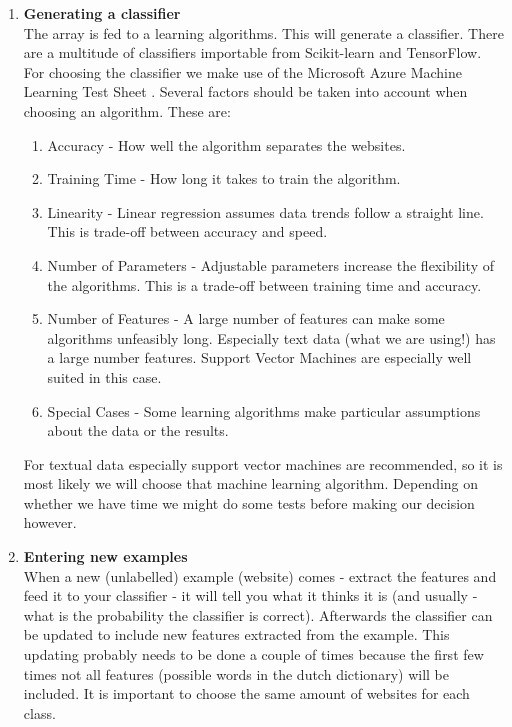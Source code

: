 \begin{enumerate}
    \item \textbf{Generating a classifier} \\
    The array is fed to a learning algorithms. This will generate a classifier. There are a multitude of classifiers importable from Scikit-learn and TensorFlow. For choosing the classifier we make use of the Microsoft Azure Machine Learning Test Sheet \cite{MLCheatSheet}. Several factors should be taken into account when choosing an algorithm. These are:
    \begin{enumerate}
        \item Accuracy - How well the algorithm separates the websites.
        \item Training Time - How long it takes to train the algorithm.
        \item Linearity - Linear regression assumes data trends follow a straight line. This is trade-off between accuracy and speed.
        \item Number of Parameters - Adjustable parameters increase the flexibility of the algorithms. This is a trade-off between training time and accuracy.
        \item Number of Features - A large number of features can make some algorithms unfeasibly long. Especially text data (what we are using!) has a large number features. Support Vector Machines are especially well suited in this case.
        \item Special Cases - Some learning algorithms make particular assumptions about the data or the results.
    \end{enumerate}
    
    For textual data especially support vector machines are recommended, so it is most likely we will choose that machine learning algorithm. Depending on whether we have time we might do some tests before making our decision however.
    
    \item \textbf{Entering new examples} \\
    When a new (unlabelled) example (website) comes - extract the features and feed it to your classifier - it will tell you what it thinks it is (and usually - what is the probability the classifier is correct). Afterwards the classifier can be updated to include new features extracted from the example. This updating probably needs to be done a couple of times because the first few times not all features (possible words in the dutch dictionary) will be included. It is important to choose the same amount of websites for each class.
\end{enumerate}


